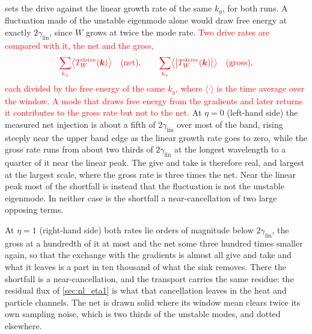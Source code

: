 \documentclass{jpp}
\renewcommand{\vec}[1]{\boldsymbol{#1}}
\newcommand{\vec}[1]{\boldsymbol{#1}}
\begin{document}
 sets the drive against the linear growth rate of the same $k_y$, for both runs. A fluctuation made of the unstable eigenmode alone would draw free energy at exactly $2\gamma_\mathrm{lin}$, since $W$ grows at twice the mode rate. \textcolor{red}{Two drive rates are compared with it, the net and the gross,}
\begin{equation}\label{eq:gross_net}
\textcolor{red}{\sum_{k_x}\bigl\langle T_W^\mathrm{drive}(\vec k)\bigr\rangle \quad\text{(net)}, \qquad \sum_{k_x}\bigl\langle\bigl|T_W^\mathrm{drive}(\vec k)\bigr|\bigr\rangle \quad\text{(gross)},}
\end{equation}
\textcolor{red}{each divided by the free energy of the same $k_y$, where $\langle\cdot\rangle$ is the time average over the window. A mode that draws free energy from the gradients and later returns it contributes to the gross rate but not to the net.} At $\eta = 0$ (left-hand side) the measured net injection is about a fifth of $2\gamma_\mathrm{lin}$ over most of the band, rising steeply near the upper band edge as the linear growth rate goes to zero, while the gross rate runs from about two thirds of $2\gamma_\mathrm{lin}$ at the longest wavelength to a quarter of it near the linear peak. The give and take is therefore real, and largest at the largest scale, where the gross rate is three times the net. Near the linear peak most of the shortfall is instead that the fluctuation is not the unstable eigenmode. In neither case is the shortfall a near-cancellation of two large opposing terms. {\color{red}At $\eta = 1$ (right-hand side) both rates lie orders of magnitude below $2\gamma_\mathrm{lin}$, the gross at a hundredth of it at most and the net some three hundred times smaller again, so that the exchange with the gradients is almost all give and take and what it leaves is a part in ten thousand of what the sink removes. There the shortfall is a near-cancellation, and the transport carries the same residue: the residual flux of \cref{sec:nl_eta1} is what that cancellation leaves in the heat and particle channels. The net is drawn solid where its window mean clears twice its own sampling noise, which is two thirds of the unstable modes, and dotted elsewhere.

}
\end{document}
